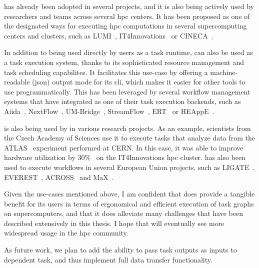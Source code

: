 \hyperqueue{} has already been adopted in several projects, and it is also being actively
used by researchers and teams across several \gls{hpc} centers. It has been proposed
as one of the designated ways for executing \gls{hpc} computations in several
supercomputing centers and clusters, such as LUMI~\cite{it4i-lumi},
IT4Innovations~\cite{it4i-hq} or CINECA~\cite{cineca}.

In addition to being used directly by users as a task runtime, \hyperqueue{} can also be
used as a task execution system, thanks to its sophisticated resource management and task
scheduling capabilites. It facilitates this use-case by offering a machine-readable
(\gls{json}) output mode for its \gls{cli}, which makes it easier for
other tools to use \hyperqueue{} programmatically. This has been leveraged by several
workflow management systems that have integrated \hyperqueue{} as one of their task
execution backends, such as Aiida~\cite{aiida-hq}, NextFlow~\cite{nextflow-hq},
UM-Bridge~\cite{umbridge}, StreamFlow~\cite{streamflow-hq}, ERT~\cite{ert} or HEAppE~\cite{heappe}.

\hyperqueue{} is also being used by in various research projects. As an example,
scientists from the Czech Academy of Sciences use it to execute tasks that analyze data from the
ATLAS~\cite{atlas} experiment performed at CERN. In this case, it was able to improve
hardware utilization by 30\%~\cite{cern-hq} on the IT4Innovations \gls{hpc}
cluster. \hyperqueue{} has also been used to execute workflows in several European Union
projects, such as LIGATE~\cite{ligate}, EVEREST~\cite{everest},
ACROSS~\cite{across} and MaX~\cite{max}.

Given the use-cases mentioned above, I am confident that \hyperqueue{} does provide a
tangible benefit for its users in terms of ergonomical and efficient execution of task graphs on
supercomputers, and that it does alleviate many challenges that have been described
extensively in this thesis. I hope that \hyperqueue{} will eventually see more widespread
usage in the \gls{hpc} community.

As future work, we plan to add the ability to pass task outputs as inputs to dependent task, and
thus implement full data transfer functionality.
